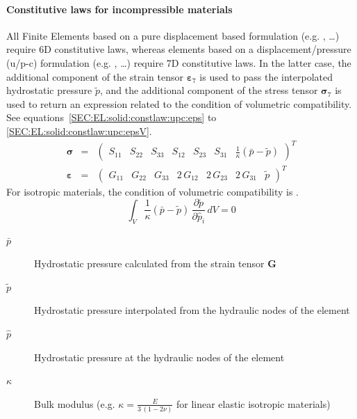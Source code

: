 \paragraph{Constitutive laws for incompressible materials}
All Finite Elements based on a pure displacement based formulation (e.g. , \ldots) require 6D constitutive laws,
whereas elements based on a displacement/pressure (u/p-c) formulation (e.g. , \ldots) require 7D constitutive laws.
In the latter case, the additional component of the strain tensor $\boldsymbol{\varepsilon}_7$ is used to pass the interpolated
hydrostatic pressure $\tilde{p}$, and the additional component of the stress tensor $\boldsymbol{\sigma}_7$ is used to return an
expression related to the condition of volumetric compatibility. See equations~\ref{SEC:EL:solid:constlaw:upc:eps} to \ref{SEC:EL:solid:constlaw:upc:epsV}.
\begin{eqnarray}
  \boldsymbol{\sigma} & = & \begin{pmatrix} S_{11} & S_{22} & S_{33} & S_{12} & S_{23} & S_{31} & \frac{1}{\kappa}\left(\bar{p} - \tilde{p}\right) \end{pmatrix}^T \label{SEC:EL:solid:constlaw:upc:eps} \\
  \boldsymbol{\varepsilon} & = & \begin{pmatrix} G_{11} & G_{22} & G_{33} & 2\,G_{12} & 2\,G_{23} & 2\,G_{31} & \tilde{p} \end{pmatrix}^T \label{SEC:EL:solid:constlaw:upc:sigma}
\end{eqnarray}
For isotropic materials, the condition of volumetric compatibility is \cite{BATHE2016}.
\begin{equation}
\int_{V}\frac{1}{\kappa}\left(\bar{p} - \tilde{p}\right)\,\frac{\partial\tilde{p}}{\partial\hat{p}_i}\,dV = 0 \label{SEC:EL:solid:constlaw:upc:epsV}
\end{equation}
\begin{description}
\item[$\bar{p}$] Hydrostatic pressure calculated from the strain tensor $\boldsymbol{G}$
\item[$\tilde{p}$] Hydrostatic pressure interpolated from the hydraulic nodes of the element
\item[$\hat{p}$] Hydrostatic pressure at the hydraulic nodes of the element
\item[$\kappa$] Bulk modulus (e.g. $\kappa=\frac{E}{3\,\left(1-2\nu\right)}$ for linear elastic isotropic materials)
\end{description}

